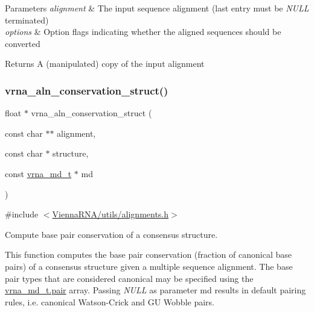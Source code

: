 \begin{DoxyParams}{Parameters}
{\em alignment} & The input sequence alignment (last entry must be {\itshape N\+U\+LL} terminated) \\
\hline
{\em options} & Option flags indicating whether the aligned sequences should be converted \\
\hline
\end{DoxyParams}
\begin{DoxyReturn}{Returns}
A (manipulated) copy of the input alignment 
\end{DoxyReturn}
\mbox{\label{group__aln__utils_gab6f16a2ea93f3bfd4d089cc8d448bb16}} 
\subsubsection{\texorpdfstring{vrna\_aln\_conservation\_struct()}{vrna\_aln\_conservation\_struct()}}
{\footnotesize\ttfamily float $\ast$ vrna\+\_\+aln\+\_\+conservation\+\_\+struct (\begin{DoxyParamCaption}\item[{const char $\ast$$\ast$}]{alignment,  }\item[{const char $\ast$}]{structure,  }\item[{const \mbox{\hyperlink{group__model__details_ga1f8a10e12a0a1915f2a4eff0b28ea17c}{vrna\+\_\+md\+\_\+t}} $\ast$}]{md }\end{DoxyParamCaption})}



{\ttfamily \#include $<$\mbox{\hyperlink{utils_2alignments_8h}{Vienna\+R\+N\+A/utils/alignments.\+h}}$>$}



Compute base pair conservation of a consensus structure. 

This function computes the base pair conservation (fraction of canonical base pairs) of a consensus structure given a multiple sequence alignment. The base pair types that are considered canonical may be specified using the \mbox{\hyperlink{group__model__details_ab4da594c638707e212f64aadb54a7454}{vrna\+\_\+md\+\_\+t.\+pair}} array. Passing {\itshape N\+U\+LL} as parameter {\ttfamily md} results in default pairing rules, i.\+e. canonical Watson-\/\+Crick and GU Wobble pairs.



